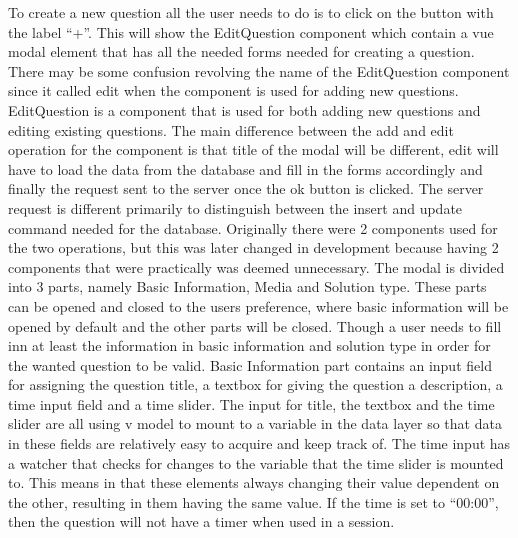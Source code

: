 To create a new question all the user needs to do is to click on the button with the label “+”. This will show the EditQuestion component which contain a vue modal element that has all the needed forms needed for creating a question. There may be some confusion revolving the name of the EditQuestion component since it called edit when the component is used for adding new questions. EditQuestion is a component that is used for both adding new questions and editing existing questions. The main difference between the add and edit operation for the component is that title of the modal will be different, edit will have to load the data from the database and fill in the forms accordingly and finally the request sent to the server once the ok button is clicked. The server request is different primarily to distinguish between the insert and update command needed for the database. Originally there were 2 components used for the two operations, but this was later changed in development because having 2 components that were practically was deemed unnecessary. The modal is divided into 3 parts, namely Basic Information, Media and Solution type.  These parts can be opened and closed to the users preference, where basic information will be opened by default and the other parts will be closed. Though a user needs to fill inn at least the information in basic information and solution type in order for the wanted question to be valid. Basic Information part contains an input field for assigning the question title, a textbox for giving the question a description, a time input field and a time slider. The input for title, the textbox and the time slider are all using v model to mount to a variable in the data layer so that data in these fields are relatively easy to acquire and keep track of. The time input has a watcher that checks for changes to the variable that the time slider is mounted to. This means in that these elements always changing their value dependent on the other, resulting in them having the same value. If the time is set to “00:00”, then the question will not have a timer when used in a session.\\[11pt]
